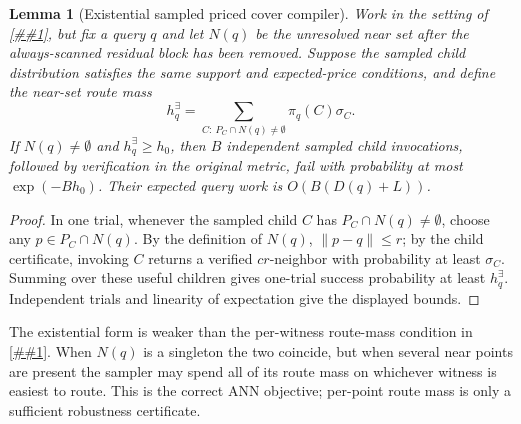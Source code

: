 \documentclass[10pt]{article}
\newcommand{\cref}[1]{\ref{##1}}
\newtheorem{lemma}[theorem]{Lemma}
\theoremstyle{definition}
\begin{document}
\begin{lemma}[Existential sampled priced cover compiler]
   \label{lem:existential-sampled-priced-cover}
   Work in the setting of \cref{lem:sampled-priced-cover}, but fix a query
   \(q\) and let \(N(q)\) be the unresolved near set after the always-scanned
   residual block has been removed.  Suppose the sampled child distribution
   satisfies the same support and expected-price conditions, and define the
   near-set route mass
   \[
      h_q^{\exists}
      =
      \sum_{C:\ P_C\cap N(q)\ne\emptyset}\pi_q(C)\sigma_C .
   \]
   If \(N(q)\ne\emptyset\) and \(h_q^{\exists}\ge h_0\), then
   \(B\) independent sampled child invocations, followed by verification in the
   original metric, fail with probability at most \(\exp(-Bh_0)\).  Their
   expected query work is \(O(B(D(q)+L))\).
\end{lemma}

\begin{proof}
   In one trial, whenever the sampled child \(C\) has
   \(P_C\cap N(q)\ne\emptyset\), choose any
   \(p\in P_C\cap N(q)\).  By the definition of \(N(q)\), \(\|p-q\|\le r\);
   by the child certificate, invoking \(C\) returns a verified
   \(cr\)-neighbor with probability at least \(\sigma_C\).  Summing over these
   useful children gives one-trial success probability at least
   \(h_q^{\exists}\).  Independent trials and linearity of expectation give
   the displayed bounds.
\end{proof}

The existential form is weaker than the per-witness route-mass condition in
\cref{lem:sampled-priced-cover}.  When \(N(q)\) is a singleton the two coincide,
but when several near points are present the sampler may spend all of its route
mass on whichever witness is easiest to route.  This is the correct ANN
objective; per-point route mass is only a sufficient robustness certificate.
\end{document}
